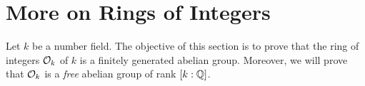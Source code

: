 \section{More on Rings of Integers}

Let $k$ be a number field. The objective of this section is to prove that the ring of integers $\mathcal{O}_k$ of $k$ is a finitely generated abelian group. Moreover, we will prove that $\mathcal{O}_k$ is a \textit{free} abelian group of rank $\left[ k : \mathbb{Q} \right]$.


